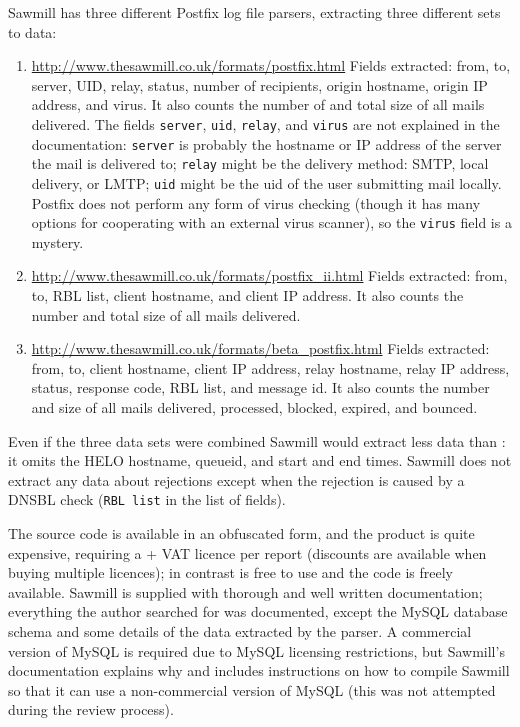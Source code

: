 Sawmill has three different Postfix log file parsers, extracting three
different sets to data:

\begin{enumerate}

    \item \url{http://www.thesawmill.co.uk/formats/postfix.html} \newline{}
        Fields extracted: from, to, server, UID, relay, status, number of
        recipients, origin hostname, origin \gls{IP} address, and virus.
        It also counts the number of and total size of all mails delivered.
        The fields \texttt{server}, \texttt{uid}, \texttt{relay}, and
        \texttt{virus} are not explained in the documentation:
        \texttt{server} is probably the hostname or \gls{IP} address of the
        server the mail is delivered to; \texttt{relay} might be the
        delivery method: \gls{SMTP}, local delivery, or \gls{LMTP};
        \texttt{uid} might be the uid of the user submitting mail locally.
        Postfix does not perform any form of virus checking (though it has
        many options for cooperating with an external virus scanner), so
        the \texttt{virus} field is a mystery.

    \item \url{http://www.thesawmill.co.uk/formats/postfix_ii.html}
        \newline{} Fields extracted: from, to, RBL list, client hostname,
        and client \gls{IP} address.  It also counts the number and total
        size of all mails delivered.  

    \item \url{http://www.thesawmill.co.uk/formats/beta_postfix.html}
        \newline{} Fields extracted: from, to, client hostname, client
        \gls{IP} address, relay hostname, relay \gls{IP} address, status,
        response code, RBL list, and message id.  It also counts the number
        and size of all mails delivered, processed, blocked, expired, and
        bounced.

\end{enumerate}

Even if the three data sets were combined Sawmill would extract less data
than \parsername{}: it omits the HELO hostname, queueid, and start and end
times.  Sawmill does not extract any data about rejections except when the
rejection is caused by a \gls{DNSBL} check (\texttt{RBL list} in the list
of fields).

The source code is available in an obfuscated form, and the product is
quite expensive, requiring a  + VAT licence per report
(discounts are available when buying multiple licences); in contrast
\parsername{} is free to use and the code is freely available.  Sawmill is
supplied with thorough and well written documentation; everything the
author searched for was documented, except the MySQL database schema and
some details of the data extracted by the parser.  A commercial version of
MySQL is required due to MySQL licensing restrictions, but Sawmill's
documentation explains why and includes instructions on how to compile
Sawmill so that it can use a non-commercial version of MySQL (this was not
attempted during the review process).

